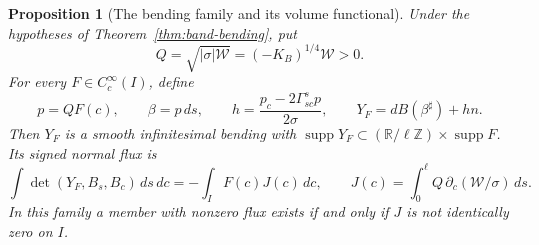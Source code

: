 \documentclass[11pt]{amsart}
\newtheorem{proposition}[theorem]{Proposition}
\theoremstyle{definition}
\newcommand{\R}{\mathbb R}
\DeclareMathOperator{\supp}{supp}
\begin{document}
\begin{proposition}[The bending family and its volume functional]
\label{prop:codazzi-family}
Under the hypotheses of Theorem~\ref{thm:band-bending}, put
\begin{equation}\label{eq:geometric-factor}
 Q=\sqrt{|\sigma|\mathcal W}=(-K_B)^{1/4}\mathcal W>0.
\end{equation}
For every $F\in C_c^\infty(I)$, define
\begin{equation}\label{eq:geometric-field}
 p=QF(c),\qquad \beta=p\,ds,\qquad
 h=\frac{p_c-2\Gamma^s_{sc}p}{2\sigma},\qquad
 Y_F=dB(\beta^\sharp)+hn.
\end{equation}
Then $Y_F$ is a smooth infinitesimal bending with
$\supp Y_F\subset(\R/\ell\mathbb Z)\times\supp F$.
Its signed normal flux is
\begin{equation}\label{eq:geometric-flux}
 \int\det(Y_F,B_s,B_c)\,ds\,dc
       =-\int_I F(c)J(c)\,dc,\qquad
 J(c)=\int_0^\ell Q\,\partial_c(\mathcal W/\sigma)\,ds.
\end{equation}
In this family a member with nonzero flux exists if and only if
$J$ is not identically zero on $I$.
\end{proposition}
\end{document}

